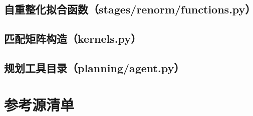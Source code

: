 \documentclass[UTF8]{ctexart}
\begin{document}
\subsection{自重整化拟合函数（stages/renorm/functions.py）}



\subsection{匹配矩阵构造（kernels.py）}



\subsection{规划工具目录（planning/agent.py）}



\section{参考源清单}
\end{document}
